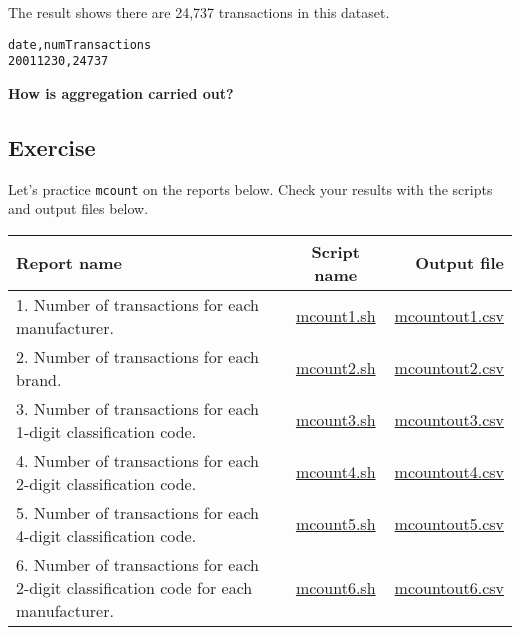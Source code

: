 \noindent
The result shows there are 24,737 transactions in this dataset. 

\begin{verbatim}
date,numTransactions
20011230,24737
\end{verbatim}


{\setlength{\parindent}{0cm}
\textbf{How is aggregation carried out? }\\


}

\newpage 

\subsection{Exercise }

Let's practice \verb|mcount| on the reports below. Check your results with the scripts and output files below. 

\begin{table}[htbp]
{\small
\begin{tabular}{ l | c || r }
\hline
\textbf{Report name}   & \textbf{Script name} & \textbf{Output file}  \\
\hline
1. Number of transactions for each manufacturer. & \href{exercise/mcount1.sh}{mcount1.sh} & \href{exercise/outdat/mcountout1.csv}{mcountout1.csv} \\
2. Number of transactions for each brand. & \href{exercise/mcount2.sh}{mcount2.sh} & \href{exercise/outdat/mcountout2.csv}{mcountout2.csv} \\
3. Number of transactions for each 1-digit classification code. & \href{exercise/mcount3.sh}{mcount3.sh} & \href{exercise/outdat/mcountout3.csv}{mcountout3.csv} \\
4. Number of transactions for each 2-digit classification code. & \href{exercise/mcount4.sh}{mcount4.sh} & \href{exercise/outdat/mcountout4.csv}{mcountout4.csv} \\
5. Number of transactions for each 4-digit classification code. & \href{exercise/mcount5.sh}{mcount5.sh} & \href{exercise/outdat/mcountout5.csv}{mcountout5.csv} \\
6. Number of transactions for each 2-digit classification code for each manufacturer. & \href{exercise/mcount6.sh}{mcount6.sh} & \href{exercise/outdat/mcountout6.csv}{mcountout6.csv} \\

\hline
\end{tabular} 
}
\end{table} 


%
